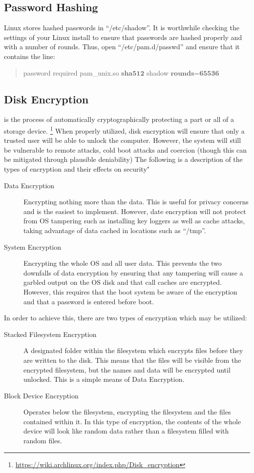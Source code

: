 		\subsection{Password Hashing}
			Linux stores hashed passwords in ``/etc/shadow''.
			It is worthwhile checking the settings of your Linux install to ensure that passwords are hashed properly and with a number of rounds. Thus, open ``/etc/pam.d/passwd'' and ensure that it contains the line:
			\begin{quote}
				password required pam\_unix.so $\textbf{sha512}$ shadow $\textbf{rounds=65536}$
			\end{quote}
		\subsection{Disk Encryption}
			is the process of automatically cryptographically protecting a part or all of a storage device.
			\footnote{\url{https://wiki.archlinux.org/index.php/Disk\_encryption}}
			When properly utilized, disk encryption will ensure that only a trusted user will be able to unlock the computer.
			However, the system will still be vulnerable to remote attacks, cold boot attacks and coercion (though this can be mitigated through plausible deniability)
			The following is a description of the types of encryption and their effects on security"
			\begin{description}
				\item[Data Encryption] Encrypting nothing more than the data.
					This is useful for privacy concerns and is the easiest to implement.
					However, date encryption will not protect from OS tampering such as installing key loggers as well as cache attacks, taking advantage of data cached in locations such as ``/tmp''.
				\item[System Encryption] Encrypting the whole OS and all user data.
					This prevents the two downfalls of data encryption by ensuring that any tampering will cause a garbled output on the OS disk and that call caches are encrypted.
					However, this requires that the boot system be aware of the encryption and that a password is entered before boot.
			\end{description}
			In order to achieve this, there are two types of encryption which may be utilized:
			\begin{description}
				\item[Stacked Filesystem Encryption] A designated folder within the filesystem which encrypts files before they are written to the disk.
					This means that the files will be visible from the encrypted filesystem, but the names and data will be encrypted until unlocked.
					This is a simple means of Data Encryption.
				\item[Block Device Encryption] Operates below the filesystem, encrypting the filesystem and the files contained within it.
					In this type of encryption, the contents of the whole device will look like random data rather than a filesystem filled with random files.
			\end{description}
